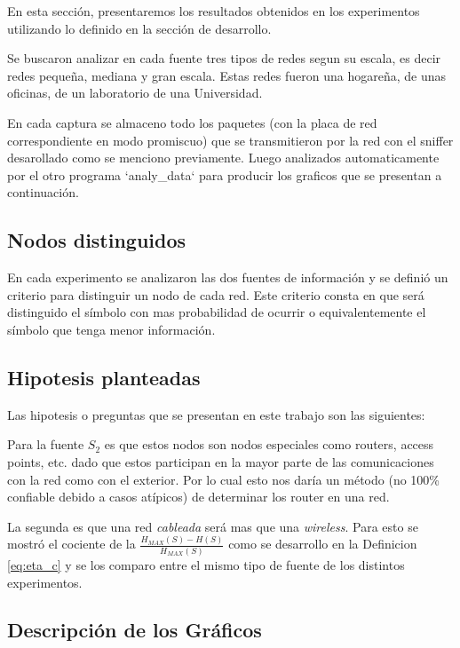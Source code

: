En esta secci\'on, presentaremos los resultados obtenidos en los experimentos
utilizando lo definido en la secci\'on de desarrollo.

Se buscaron analizar en cada fuente tres tipos de redes segun su escala, es
decir redes pequeña, mediana y gran escala. Estas redes fueron
una hogareña, de unas oficinas, de un laboratorio de una Universidad.

En cada captura se almaceno todo los paquetes (con la placa de red
correspondiente en modo promiscuo) que se transmitieron por la red con el
sniffer desarollado como se menciono previamente. Luego analizados
automaticamente por el otro programa `analy\_data` para producir los graficos
que se presentan a continuación.

\subsection{Nodos distinguidos}

En cada experimento se analizaron las dos fuentes de información y se definió
un criterio para distinguir un nodo de cada red. Este criterio consta en que
será distinguido el símbolo con mas probabilidad de ocurrir o equivalentemente
el símbolo que tenga menor información.

\subsection{Hipotesis planteadas} \label{sec:hipotesis}

Las hipotesis o preguntas que se presentan en este trabajo son las siguientes:

Para la fuente $S_2$ es que estos nodos  son
nodos especiales como routers, access points, etc. dado que estos participan
en la mayor parte de las comunicaciones con la red como con el exterior.
Por lo cual esto nos daría un método (no 100\% confiable debido a casos
atípicos) de determinar los router en una red.

La segunda es que una red \textit{cableada} será
mas  que una \textit{wireless}. Para esto se mostró el
cociente de la $\frac{H_{MAX}(S)-H(S)}{H_{MAX}(S)}$ como se desarrollo en la Definicion \ref{eq:eta_c}
y se los comparo entre el mismo tipo de fuente de los distintos experimentos.

\subsection{Descripción de los Gráficos}

